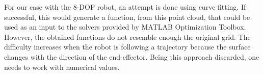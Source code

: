 %
%





For our case with the 8-DOF robot, an attempt is done using curve fitting. If successful, this would generate a function, from this point cloud, that could be used as an input to the solvers provided by MATLAB Optimization Toolbox. However, the obtained functions do not resemble enough the original grid. The difficulty increases when the robot is following a trajectory because the surface changes with the direction of the end-effector. Being this approach discarded, one needs to work with numerical values. 





